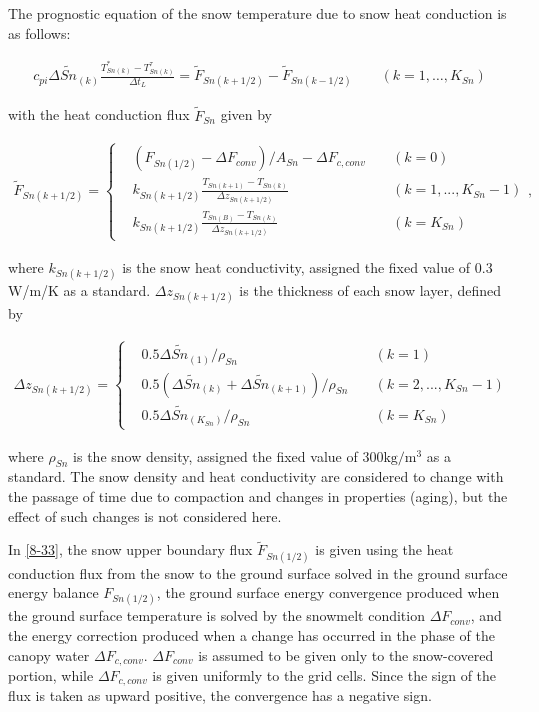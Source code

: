 The prognostic equation of the snow temperature due to snow heat conduction is as follows:

\begin{eqnarray}
c_{pi}\Delta \widetilde{Sn}_{(k)} \frac{T_{Sn(k)}^{\ast} - T_{Sn(k)}^{\tau}}{\Delta t_L} = \widetilde{F}_{Sn(k+1/2)} - \widetilde{F}_{Sn(k-1/2)}
\qquad (k=1,\ldots,K_{Sn}) \label{8-32}
\end{eqnarray}

with the heat conduction flux \(\widetilde{F}_{Sn}\) given by

\begin{eqnarray}
\widetilde{F}_{Sn(k+1/2)}
 = \left\{
 \begin{aligned}
  & (F_{Sn(1/2)} - \Delta F_{conv}) / A_{Sn} - \Delta F_{c,conv}
  \; &&(k = 0) \\
  & k_{Sn(k+1/2)} \frac{T_{Sn(k+1)}-T_{Sn(k)}}{\Delta z_{Sn(k+1/2)}}
  \; &&(k = 1, ..., K_{Sn}-1) \\
  & k_{Sn(k+1/2)} \frac{T_{Sn(B)}-T_{Sn(k)}}{\Delta z_{Sn(k+1/2)}}
  \; &&(k = K_{Sn})
 \end{aligned}
\right., \label{8-33}
\end{eqnarray}

where \(k_{Sn(k+1/2)}\) is the snow heat conductivity, assigned the fixed value of 0.3 W/m/K as a standard. \(\Delta z_{Sn(k+1/2)}\) is the thickness of each snow layer, defined by

\begin{eqnarray}
\Delta z_{Sn(k+1/2)}
 = \left\{
 \begin{aligned}
  & 0.5 \Delta \widetilde{Sn}_{(1)} / \rho_{Sn}
  \; &&(k = 1) \\
  & 0.5 (\Delta \widetilde{Sn}_{(k)} + \Delta \widetilde{Sn}_{(k+1)}) / \rho_{Sn}
  \; &&(k = 2, ..., K_{Sn}-1) \\
  & 0.5 \Delta \widetilde{Sn}_{(K_{Sn})} / \rho_{Sn}
  \; &&(k = K_{Sn})
 \end{aligned}
\right. \label{8-34}
\end{eqnarray}

where \(\rho_{Sn}\) is the snow density, assigned the fixed value of \(300 \mathrm{kg/m^3}\) as a standard. The snow density and heat conductivity are considered to change with the passage of time due
to compaction and changes in properties (aging), but the effect of such changes is not considered here.

In \ref{8-33}, the snow upper boundary flux \(\widetilde{F}_{Sn(1/2)}\) is given using the heat conduction flux from the snow to the ground surface solved in the ground surface energy
balance \(F_{Sn(1/2)}\), the ground surface energy convergence produced when the ground surface temperature is solved by the snowmelt condition \(\Delta F_{conv}\), and the energy correction produced
when a change has occurred in the phase of the canopy water \(\Delta F_{c,conv}\). \(\Delta F_{conv}\) is assumed to be given only to the snow-covered portion, while \(\Delta F_{c,conv}\) is given
uniformly to the grid cells. Since the sign of the flux is taken as upward positive, the convergence has a negative sign.

